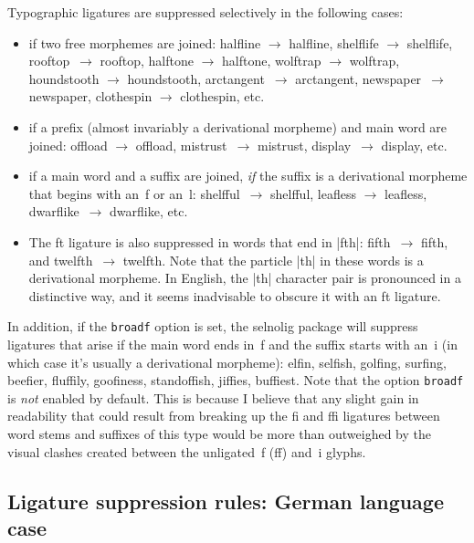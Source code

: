 \documentclass[11pt]{article}
\newcommand{\pkg}[1]{\textsf{#1}}
\newcommand{\opt}[1]{\texttt{#1}}
\begin{document}
Typographic ligatures are suppressed selectively in the following cases:
\begin{itemize}
\item if two free morphemes are joined: \mbox{halfline} $\to$ halfline, \mbox{shelflife} $\to$ shelflife, \mbox{rooftop}~$\to$ rooftop, \mbox{halftone} $\to$ halftone, \mbox{wolftrap} $\to$ wolftrap, \mbox{houndstooth} $\to$ houndstooth, \mbox{arctan}\-gent~$\to$ arctangent, \mbox{newspaper}~$\to$ newspaper, \mbox{clothespin} $\to$ clothespin, etc.

\item if a prefix (almost invariably a derivational morpheme) and main word are joined: \mbox{offload} $\to$ offload, mi\mbox{st}rust~$\to$ mistrust, di\mbox{sp}lay~$\to$ display, etc. 

\item if a main word and a suffix are joined, \emph{if} the suffix is a derivational morpheme that begins with an~f or an~l: \mbox{shelfful}~$\to$ shelfful, \mbox{leafless} $\to$ leafless, \mbox{dwarflike}~$\to$ dwarflike, etc. 

\item The ft ligature is also suppressed in words that end in |fth|: \mbox{fifth}~$\to$ fifth, and \mbox{twelfth}~$\to$ twelfth. Note that the particle |th| in these words is a derivational morpheme. In English, the |th| character pair is pronounced in a distinctive way, and it seems inadvisable to obscure it with an ft ligature.
\end{itemize}

In addition, if the \opt{broadf} option is set, the \pkg{selnolig} package will suppress ligatures that arise if the main word ends in~f and the suffix starts with an~i (in which case it's usually a derivational morpheme): elfin, selfish, golfing, surfing, beefier, fluffily, goofiness, standoffish, jiffies, buffiest. Note that the option \opt{broadf} is \emph{not} enabled by default. This is because I believe that any slight gain in readability that could result from breaking up the fi and ffi ligatures between word stems and suffixes of this type would be more than outweighed by the visual clashes created between the unligated~f (ff) and~i glyphs. 



\subsection{Ligature suppression rules: German language case}
\end{document}
